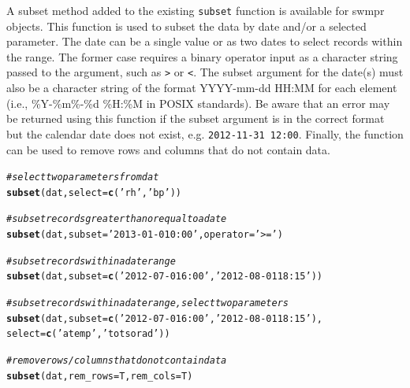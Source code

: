 \documentclass[10pt,letterpaper]{article}\usepackage[]{graphicx}\usepackage[]{color}
\makeatletter
\newcommand{\hlstr}[1]{\textcolor[rgb]{0.192,0.494,0.8}{#1}}%
\newcommand{\hlcom}[1]{\textcolor[rgb]{0.678,0.584,0.686}{\textit{#1}}}%
\newcommand{\hlstd}[1]{\textcolor[rgb]{0.345,0.345,0.345}{#1}}%
\newcommand{\hlkwc}[1]{\textcolor[rgb]{0.333,0.667,0.333}{#1}}%
\newcommand{\hlkwd}[1]{\textcolor[rgb]{0.737,0.353,0.396}{\textbf{#1}}}%
\newenvironment{kframe}{%
 \def\at@end@of@kframe{}%
 \ifinner\ifhmode%
  \def\at@end@of@kframe{\end{minipage}}%
  \begin{minipage}{\columnwidth}%
 \fi\fi%
 \def\FrameCommand##1{\hskip\@totalleftmargin \hskip-\fboxsep
 \colorbox{shadecolor}{##1}\hskip-\fboxsep
     \hskip-\linewidth \hskip-\@totalleftmargin \hskip\columnwidth}%
 \MakeFramed {\advance\hsize-\width
   \@totalleftmargin\z@ \linewidth\hsize
   \@setminipage}}%
 {\par\unskip\endMakeFramed%
 \at@end@of@kframe}
\newenvironment{knitrout}{}{} %
\makeatother
\begin{document}
A subset method added to the existing \texttt{subset} function is available for swmpr objects.  This function is used to subset the data by date and/or a selected parameter.  The date can be a single value or as two dates to select records within the range. The former case requires a binary operator input as a character string passed to the argument, such as \texttt{>} or \texttt{<}.  The subset argument for the date(s) must also be a character string of the format YYYY-mm-dd HH:MM for each element (i.e., \%Y-\%m\%-\%d \%H:\%M in POSIX standards).  Be aware that an error may be returned using this function if the subset argument is in the correct format but the calendar date does not exist, e.g. \texttt{2012-11-31 12:00}.  Finally, the function can be used to remove rows and columns that do not contain data. 

\begin{knitrout}
\color{fgcolor}\begin{kframe}
\begin{alltt}
\hlcom{# select two parameters from dat}
\hlkwd{subset}\hlstd{(dat,} \hlkwc{select} \hlstd{=} \hlkwd{c}\hlstd{(}\hlstr{'rh'}\hlstd{,} \hlstr{'bp'}\hlstd{))}

\hlcom{# subset records greater than or equal to a date}
\hlkwd{subset}\hlstd{(dat,} \hlkwc{subset} \hlstd{=} \hlstr{'2013-01-01 0:00'}\hlstd{,} \hlkwc{operator} \hlstd{=} \hlstr{'>='}\hlstd{)}

\hlcom{# subset records within a date range}
\hlkwd{subset}\hlstd{(dat,} \hlkwc{subset} \hlstd{=} \hlkwd{c}\hlstd{(}\hlstr{'2012-07-01 6:00'}\hlstd{,} \hlstr{'2012-08-01 18:15'}\hlstd{))}

\hlcom{# subset records within a date range, select two parameters}
\hlkwd{subset}\hlstd{(dat,} \hlkwc{subset} \hlstd{=} \hlkwd{c}\hlstd{(}\hlstr{'2012-07-01 6:00'}\hlstd{,} \hlstr{'2012-08-01 18:15'}\hlstd{),}
  \hlkwc{select} \hlstd{=} \hlkwd{c}\hlstd{(}\hlstr{'atemp'}\hlstd{,} \hlstr{'totsorad'}\hlstd{))}

\hlcom{# remove rows/columns that do not contain data}
\hlkwd{subset}\hlstd{(dat,} \hlkwc{rem_rows} \hlstd{= T,} \hlkwc{rem_cols} \hlstd{= T)}
\end{alltt}
\end{kframe}
\end{knitrout}
\end{document}
